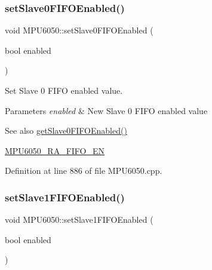 \subsubsection{\texorpdfstring{setSlave0FIFOEnabled()}{setSlave0FIFOEnabled()}}
{\footnotesize\ttfamily void M\+P\+U6050\+::set\+Slave0\+F\+I\+F\+O\+Enabled (\begin{DoxyParamCaption}\item[{bool}]{enabled }\end{DoxyParamCaption})}

Set Slave 0 F\+I\+FO enabled value. 
\begin{DoxyParams}{Parameters}
{\em enabled} & New Slave 0 F\+I\+FO enabled value \\
\hline
\end{DoxyParams}
\begin{DoxySeeAlso}{See also}
\mbox{\hyperlink{classMPU6050_a6aa7aa2e3fac06f8b5ab9ee127255a5e}{get\+Slave0\+F\+I\+F\+O\+Enabled()}} 

\mbox{\hyperlink{MPU6050_8h_a1166fe50f4792f3266e15dc3273e375d}{M\+P\+U6050\+\_\+\+R\+A\+\_\+\+F\+I\+F\+O\+\_\+\+EN}} 
\end{DoxySeeAlso}


Definition at line 886 of file M\+P\+U6050.\+cpp.


\begin{DoxyCode}{0}

\end{DoxyCode}
\mbox{\label{classMPU6050_a5d432fa2fb8b2227f50aa5c7b5befb66}} 
\subsubsection{\texorpdfstring{setSlave1FIFOEnabled()}{setSlave1FIFOEnabled()}}
{\footnotesize\ttfamily void M\+P\+U6050\+::set\+Slave1\+F\+I\+F\+O\+Enabled (\begin{DoxyParamCaption}\item[{bool}]{enabled }\end{DoxyParamCaption})}

